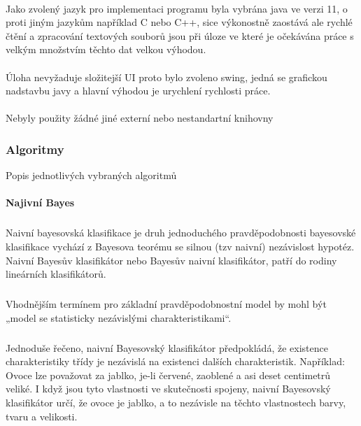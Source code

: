 \documentclass[a4paper,12pt]{article}
\begin{document}
\paragraph{}
Jako zvolený jazyk pro implementaci programu byla vybrána \textsf{java} ve verzi \textsf{11},
o proti jiným jazykům například \textsf{C} nebo \textsf{C++}, sice výkonostně zaostává ale rychlé 
čtění a zpracování textových souborů jsou při úloze ve které je očekávána práce s velkým množstvím
těchto dat velkou výhodou.
\paragraph{}
Úloha nevyžaduje složitejší UI proto bylo zvoleno \textsf{swing}, jedná se grafickou nadstavbu \textsf{javy}
a hlavní výhodou je urychlení rychlosti práce.
\paragraph{}
Nebyly použity žádné jiné externí nebo nestandartní knihovny 
\pagebreak
\subsubsection{Algoritmy}
Popis jednotlivých vybraných algoritmů
\paragraph{Najivní Bayes}
\subparagraph*{}
Naivní bayesovská klasifikace je druh jednoduchého pravděpodobnosti bayesovské klasifikace vychází z Bayesova teorému se silnou (tzv naivní) nezávislost hypotéz. Naivní Bayesův klasifikátor nebo Bayesův naivní klasifikátor, patří do rodiny lineárních klasifikátorů.
\subparagraph*{}
Vhodnějším termínem pro základní pravděpodobnostní model by mohl být „model se statisticky nezávislými charakteristikami“.
\subparagraph*{}
Jednoduše řečeno, naivní Bayesovský klasifikátor předpokládá, že existence charakteristiky třídy je nezávislá na existenci dalších charakteristik.
Například: 
Ovoce lze považovat za jablko, je-li červené, zaoblené a asi deset centimetrů veliké. I když jsou tyto vlastnosti ve skutečnosti spojeny, naivní Bayesovský klasifikátor určí, že ovoce je jablko, a to nezávisle na těchto vlastnostech barvy, tvaru a velikosti.
\end{document}

